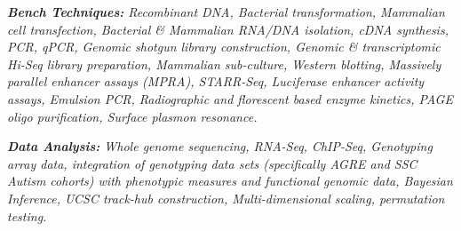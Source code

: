 \documentclass[margin, 10pt]{res} %
\begin{document}
\begin{resume}
{\sl \textbf{Bench Techniques:} Recombinant DNA, Bacterial transformation, Mammalian cell transfection, Bacterial \& Mammalian RNA/DNA isolation, cDNA synthesis, PCR, qPCR, Genomic shotgun library construction, Genomic \& transcriptomic Hi-Seq library preparation, Mammalian sub-culture, Western blotting, Massively parallel enhancer assays (MPRA), STARR-Seq, Luciferase enhancer activity assays, Emulsion PCR, Radiographic and florescent based enzyme kinetics, PAGE oligo purification, Surface plasmon resonance.}

{\sl \textbf{Data Analysis:} Whole genome sequencing, RNA-Seq, ChIP-Seq, Genotyping array data, integration of genotyping data sets (specifically AGRE and SSC Autism cohorts) with phenotypic measures and functional genomic data, Bayesian Inference, UCSC track-hub construction, Multi-dimensional scaling, permutation testing.}









\end{resume}
\end{document}
